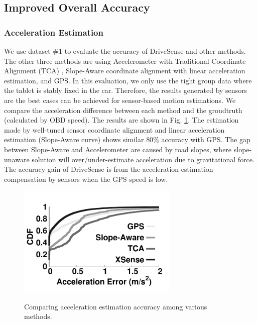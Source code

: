 \subsection{Improved Overall Accuracy}

\subsubsection{Acceleration Estimation}


We use dataset $\#1$ to evaluate the accuracy of DriveSense and
other methods. 
The other three methods are using Accelerometer with Traditional Coordinate
Alignment (TCA)  \cite{hansenspeed, wang2013sensing, chen2015invisible}, 
Slope-Aware coordinate alignment with linear 
acceleration estimation, 
and GPS.
In this evaluation, we only use the tight group data where the 
tablet is stably fixed in the car.  
Therefore, the results generated by sensors are 
the best cases can be achieved for sensor-based motion estimations. 
We compare the acceleration difference between
each method and the groudtruth (calculated by OBD speed). 
The results are shown in Fig. \ref{xsense_accuracy}. 
The estimation made by well-tuned sensor coordinate alignment and 
linear acceleration estimation (Slope-Aware curve)
shows similar $80\%$ accuracy with GPS. 
The gap between Slope-Aware and Accelerometer are caused
by road slopes, 
where slope-unaware solution will over/under-estimate 
acceleration due to gravitational force. 
The accuracy gain of DriveSense is from the 
acceleration estimation compensation by sensors
when the GPS speed is low. 

 

\begin{figure}[t]
\begin{center}
\includegraphics[width=3.0in,angle=0]{Figs/DriveSense/evaluation/xsense_accuracy.pdf}
\vspace{-0.2cm}
\caption{Comparing acceleration estimation accuracy among various methods.}
\vspace{-0.3cm}
\label{xsense_accuracy}
\end{center}
\end{figure}





